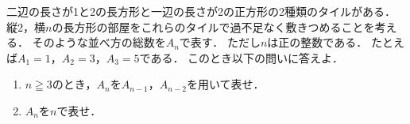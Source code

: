\documentclass[../../main.tex]{subfiles}
\begin{document}
二辺の長さが1と2の長方形と一辺の長さが2の正方形の2種類のタイルがある．
縦2，横$n$の長方形の部屋をこれらのタイルで過不足なく敷きつめることを考える．
そのような並べ方の総数を$A_n$で表す．
ただし$n$は正の整数である．
たとえば$A_1=1$，$A_2=3$，$A_3=5$である．
このとき以下の問いに答えよ．
\begin{enumerate}
  \item $n\geqq3$のとき，$A_n$を$A_{n-1}$，$A_{n-2}$を用いて表せ．
  \item $A_n$を$n$で表せ．
\end{enumerate}
\end{document}
